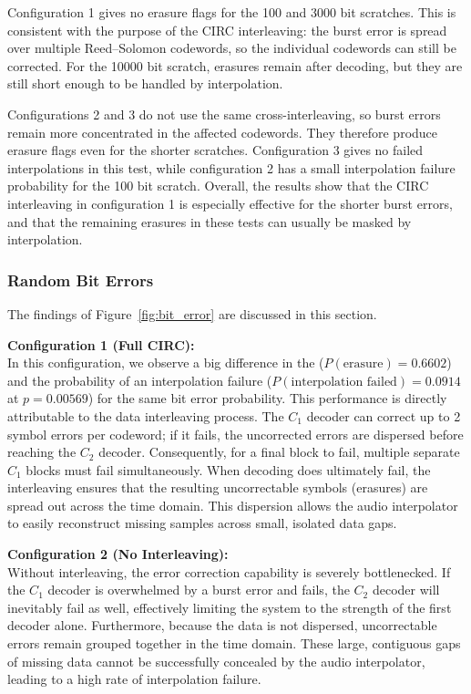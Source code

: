 \documentclass[11pt,a4paper]{article}
\begin{document}
Configuration 1 gives no erasure flags for the 100 and 3000 bit scratches. This is consistent with the purpose of the CIRC interleaving: the burst error is spread over multiple Reed--Solomon codewords, so the individual codewords can still be corrected. For the 10000 bit scratch, erasures remain after decoding, but they are still short enough to be handled by interpolation.

Configurations 2 and 3 do not use the same cross-interleaving, so burst errors remain more concentrated in the affected codewords. They therefore produce erasure flags even for the shorter scratches. Configuration 3 gives no failed interpolations in this test, while configuration 2 has a small interpolation failure probability for the 100 bit scratch. Overall, the results show that the CIRC interleaving in configuration 1 is especially effective for the shorter burst errors, and that the remaining erasures in these tests can usually be masked by interpolation.


\subsubsection{Random Bit Errors}

The findings of Figure~\ref{fig:bit_error} are discussed in this section. 

\textbf{Configuration 1 (Full CIRC):} \\
In this configuration, we observe a big difference in the ($P(\text{erasure}) = 0.6602$) and the probability of an interpolation failure ($P(\text{interpolation failed}) = 0.0914$ at $p=0.00569$) for the same bit error probability. This performance is directly attributable to the data interleaving process. The $C_1$ decoder can correct up to 2 symbol errors per codeword; if it fails, the uncorrected errors are dispersed before reaching the $C_2$ decoder. Consequently, for a final block to fail, multiple separate $C_1$ blocks must fail simultaneously. When decoding does ultimately fail, the interleaving ensures that the resulting uncorrectable symbols (erasures) are spread out across the time domain. This dispersion allows the audio interpolator to easily reconstruct missing samples across small, isolated data gaps.

\textbf{Configuration 2 (No Interleaving):} \\
Without interleaving, the error correction capability is severely bottlenecked. If the $C_1$ decoder is overwhelmed by a burst error and fails, the $C_2$ decoder will inevitably fail as well, effectively limiting the system to the strength of the first decoder alone. Furthermore, because the data is not dispersed, uncorrectable errors remain grouped together in the time domain. These large, contiguous gaps of missing data cannot be successfully concealed by the audio interpolator, leading to a high rate of interpolation failure.
\end{document}
